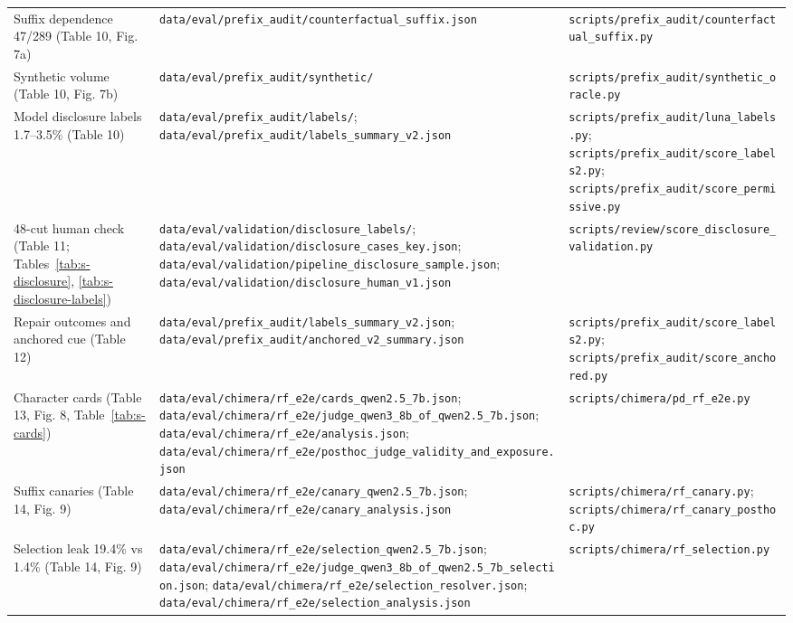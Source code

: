 \documentclass[11pt]{article}
\begin{document}
{\begin{longtable}{p{3.6cm}p{7.0cm}p{4.4cm}}
Suffix dependence 47/289 (Table 10, Fig. 7a) & \nolinkurl{data/eval/prefix_audit/counterfactual_suffix.json} & \nolinkurl{scripts/prefix_audit/counterfactual_suffix.py} \\
Synthetic volume (Table 10, Fig. 7b) & \nolinkurl{data/eval/prefix_audit/synthetic/} & \nolinkurl{scripts/prefix_audit/synthetic_oracle.py} \\
Model disclosure labels 1.7--3.5\% (Table 10) & \nolinkurl{data/eval/prefix_audit/labels/}; \nolinkurl{data/eval/prefix_audit/labels_summary_v2.json} & \nolinkurl{scripts/prefix_audit/luna_labels.py}; \nolinkurl{scripts/prefix_audit/score_labels2.py}; \nolinkurl{scripts/prefix_audit/score_permissive.py} \\
48-cut human check (Table 11; Tables~\ref{tab:s-disclosure}, \ref{tab:s-disclosure-labels}) & \nolinkurl{data/eval/validation/disclosure_labels/}; \nolinkurl{data/eval/validation/disclosure_cases_key.json}; \nolinkurl{data/eval/validation/pipeline_disclosure_sample.json}; \nolinkurl{data/eval/validation/disclosure_human_v1.json} & \nolinkurl{scripts/review/score_disclosure_validation.py} \\
Repair outcomes and anchored cue (Table 12) & \nolinkurl{data/eval/prefix_audit/labels_summary_v2.json}; \nolinkurl{data/eval/prefix_audit/anchored_v2_summary.json} & \nolinkurl{scripts/prefix_audit/score_labels2.py}; \nolinkurl{scripts/prefix_audit/score_anchored.py} \\
Character cards (Table 13, Fig. 8, Table~\ref{tab:s-cards}) & \nolinkurl{data/eval/chimera/rf_e2e/cards_qwen2.5_7b.json}; \nolinkurl{data/eval/chimera/rf_e2e/judge_qwen3_8b_of_qwen2.5_7b.json}; \nolinkurl{data/eval/chimera/rf_e2e/analysis.json}; \nolinkurl{data/eval/chimera/rf_e2e/posthoc_judge_validity_and_exposure.json} & \nolinkurl{scripts/chimera/pd_rf_e2e.py} \\
Suffix canaries (Table 14, Fig. 9) & \nolinkurl{data/eval/chimera/rf_e2e/canary_qwen2.5_7b.json}; \nolinkurl{data/eval/chimera/rf_e2e/canary_analysis.json} & \nolinkurl{scripts/chimera/rf_canary.py}; \nolinkurl{scripts/chimera/rf_canary_posthoc.py} \\
Selection leak 19.4\% vs 1.4\% (Table 14, Fig. 9) & \nolinkurl{data/eval/chimera/rf_e2e/selection_qwen2.5_7b.json}; \nolinkurl{data/eval/chimera/rf_e2e/judge_qwen3_8b_of_qwen2.5_7b_selection.json}; \nolinkurl{data/eval/chimera/rf_e2e/selection_resolver.json}; \nolinkurl{data/eval/chimera/rf_e2e/selection_analysis.json} & \nolinkurl{scripts/chimera/rf_selection.py} \\

\end{longtable}}
\end{document}
